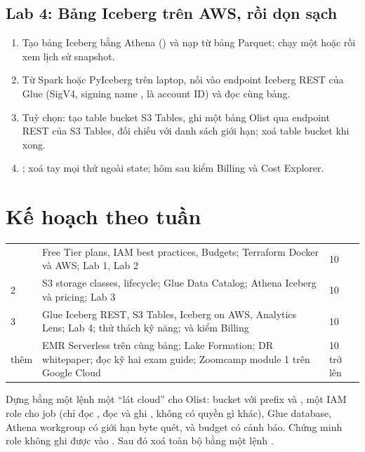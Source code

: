 \subsection{Lab 4: Bảng Iceberg trên AWS, rồi dọn sạch}
\begin{enumerate}
  \item Tạo bảng Iceberg  bằng Athena () và nạp từ bảng Parquet; chạy một  hoặc  rồi xem lịch sử snapshot.
  \item Từ Spark hoặc PyIceberg trên laptop, nối vào endpoint Iceberg REST của Glue (SigV4, signing name ,  là account ID) và đọc cùng bảng.
  \item Tuỳ chọn: tạo table bucket S3 Tables, ghi một bảng Olist qua endpoint REST của S3 Tables, đối chiếu với danh sách giới hạn; xoá table bucket khi xong.
  \item {}; xoá tay mọi thứ ngoài state; hôm sau kiểm Billing và Cost Explorer.
\end{enumerate}

\section{Kế hoạch theo tuần}
\begin{xltabular}{\textwidth}{@{}P{1.6cm} L P{1.8cm}@{}}
\toprule
{} &  &  \\
\midrule
\endhead
\bottomrule
{} & Free Tier plans, IAM best practices, Budgets; Terraform Docker và AWS; Lab 1, Lab 2 & 10 \\
2 & S3 storage classes, lifecycle; Glue Data Catalog; Athena Iceberg và pricing; Lab 3 & 10 \\
3 & Glue Iceberg REST, S3 Tables, Iceberg on AWS, Analytics Lens; Lab 4; thử thách kỹ năng;  và kiểm Billing & 10 \\
thêm & EMR Serverless trên cùng bảng; Lake Formation; DR whitepaper; đọc kỹ hai exam guide; Zoomcamp module 1 trên Google Cloud & 10 trở lên \\
\end{xltabular}

\begin{thuthach}
Dựng bằng một lệnh  một ``lát cloud'' cho Olist: bucket với prefix  và , một IAM role cho job (chỉ đọc , đọc và ghi , không có quyền gì khác), Glue database, Athena workgroup có giới hạn byte quét, và budget có cảnh báo. Chứng minh role không ghi được vào . Sau đó xoá toàn bộ bằng một lệnh .
\end{thuthach}

